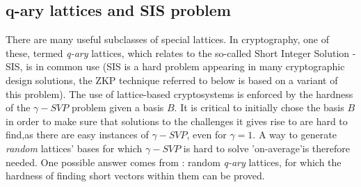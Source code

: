 \subsection{q-ary lattices and SIS problem}
\label{sub:q-ary lattices and SIS problem}
There are many useful subclasses of special lattices. In cryptography,
one of these, termed \emph{q-ary} lattices, which relates to the so-called
Short Integer Solution - SIS, is in common use (SIS is a hard problem appearing in many cryptographic design solutions, the ZKP technique referred to below is based on a variant of this problem). The use of lattice-based cryptosystems is enforced by the hardness of the
$\gamma-SVP$ problem given a basis $B$. It is critical to initially chose the
basis $B$ in order to make sure that solutions to the challenges it gives rise to are hard to find,as there are easy instances of $\gamma-SVP$, even for $\gamma=1$. A way to
generate \emph{random} lattices' bases for which $\gamma-SVP$ is hard to solve
'on-average'is therefore needed. One possible answer comes from \cite{ajtai1996generating}: random
\emph{q-ary} lattices, for which the hardness of finding short
vectors within them can be proved.


